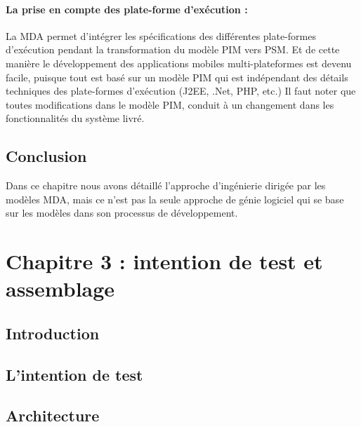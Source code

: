 \documentclass[
10pt, %
a4paper, %
oneside, %
headinclude,footinclude, %
BCOR5mm, %
]{report}
\begin{document}
    \subsubsection{La prise en compte des plate-forme d'exécution :}	
    La  MDA  permet d’intégrer  les spécifications des différentes plate-formes d'exécution pendant la transformation du modèle PIM vers PSM.  Et de cette manière le développement des applications mobiles multi-plateformes est devenu facile, puisque tout est basé sur un modèle PIM qui est indépendant des détails techniques des plate-formes d’exécution (J2EE, .Net, PHP, etc.)
    Il  faut  noter  que toutes  modifications  dans le  modèle PIM, conduit à un changement dans les fonctionnalités du système livré.

		\section{Conclusion}
		Dans ce chapitre nous avons détaillé l’approche d'ingénierie dirigée par les modèles MDA, mais ce n'est pas la seule approche de génie logiciel qui se base sur les modèles dans son processus de développement. 
										  
										  
										  
		\newpage 
		\chapter{Chapitre 3 : intention de test et assemblage}
		\minitoc  
		\section{Introduction}
		\lipsum[5] %
		\section{L'intention de test}
		\lipsum[5] %
		\section{Architecture}
		\lipsum[5] %
\end{document}
